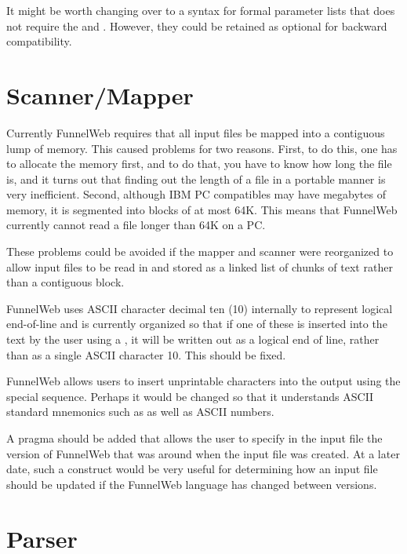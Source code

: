  It might be worth changing over to a
syntax for formal parameter lists that does not require the  and
. However, they could be retained as optional for backward
compatibility.

\section{Scanner/Mapper}

 Currently FunnelWeb requires that all
input files be mapped into a contiguous lump of memory. This caused problems
for two reasons. First, to do this, one has to allocate the memory first,
and to do that, you have to know how long the file is, and it turns out that
finding out the length of a file in a portable manner is very inefficient.
Second, although IBM PC compatibles may have megabytes of memory, it is
segmented into blocks of at most 64K. This means that FunnelWeb currently
cannot read a file longer than 64K on a PC.

These problems could be avoided if the mapper and scanner were reorganized to
allow input files to be read in and stored as a linked list of chunks of text
rather than a contiguous block.

 FunnelWeb uses ASCII character decimal ten (10)
internally to represent logical end-of-line and is currently organized so that
if one of these is inserted into the text by the user using a
, it will be written out as a logical end of line,
rather than as a single ASCII character 10. This should be
fixed.

 FunnelWeb allows users to insert
unprintable characters into the output using the 
special sequence. Perhaps it would be changed so that it understands ASCII
standard mnemonics such as  as well as ASCII
numbers.

 A  pragma should be added that allows
the user to specify in the input file the version of FunnelWeb that was
around when the input file was created. At a later date, such a construct
would be very useful for determining how an input file should be updated
if the FunnelWeb language has changed between
versions.

\section{Parser}

